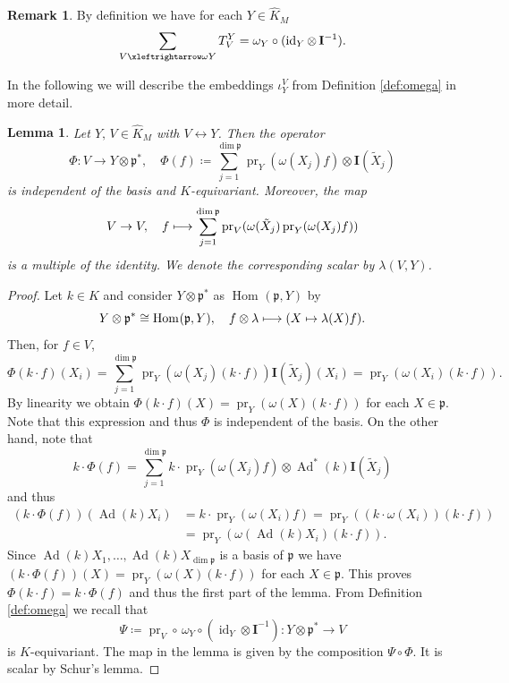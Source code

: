 \documentclass[JEP,XML,SOM,NoFloatCountersInSection,Unicode,published]{cedram}
\newcommand\mto{\mathchoice{\longmapsto}{\mapsto}{\mapsto}{\mapsto}}
\let\cdotm\cdot
\newtheorem{lemma}[theorem]{Lemma}
\theoremstyle{definition}
\newtheorem{remark}[theorem]{Remark}
\newcommand{\lra}{\ensuremath{\leftrightarrow}}
\newcommand{\lraomega}{\ensuremath{\xleftrightarrow\omega}}
\newcommand{\mf}[1]{\ensuremath{\mathfrak{#1}}}
\newcommand{\on}[1]{\ensuremath{\operatorname{#1}}}
\newcommand{\Hom}[3]{\ensuremath{\on{Hom}_{#1}(#2,#3)}}
\newcommand{\I}{\ensuremath{\mathbf{I}}}
\begin{document}
\begin{remark}\label{rem:sum_of_projections}
By definition we have for each $Y\in\hat K_M$
\[
\sum_{V\lraomega Y}T_V^Y=\omega_Y\circ(\on{id}_Y\otimes\,\I^{-1}).
\]
\end{remark}

In the following we will describe the embeddings $\iota_Y^V$ from Definition \ref{def:omega} in more detail.

\begin{lemma}\label{la:lambdaVY}
Let $Y,\, V\in\hat K_M$ with $V\lra Y$. Then the operator
\[
\Phi:V\to Y\otimes\mf p^*,\quad\Phi(f)\coloneqq\sum_{j=1}^{\dim\mf p}\on{pr}_Y(\omega(X_j)f)\otimes\I(\tilde X_j)
\]
is independent of the basis and $K$-equivariant. Moreover, the map
\[
V\to V,\quad f\mto\sum_{j=1}^{\dim\mf p}\on{pr}_V(\omega(\tilde X_j)\on{pr}_Y(\omega(X_j)f))
\]
is a multiple of the identity. We denote the corresponding scalar by $\lambda(V,Y)$.
\end{lemma}

\begin{proof}
Let $k\in K$ and consider $Y\otimes\mf p^*$ as $\Hom{}{\mf p}{Y}$ by
\[
Y\otimes\mf p^*\cong\Hom{}{\mf p}{Y},\quad f\otimes\lambda\mto(X\mapsto\lambda(X)f).
\]
Then, for $f\in V$,
\[
\Phi(k\cdotm f)(X_i)=\sum_{j=1}^{\dim\mf p}\on{pr}_Y(\omega(X_j)(k\cdotm f))\I(\tilde X_j)(X_i)=\on{pr}_Y(\omega(X_i)(k\cdotm f)).
\]
By linearity we obtain $\Phi(k\cdotm f)(X)=\on{pr}_Y(\omega(X)(k\cdotm f))$ for each $X\in\mf p$. Note that this expression and thus $\Phi$ is independent of the basis. On the other hand, note that
\[
k\cdotm \Phi(f)=\sum_{j=1}^{\dim\mf p}k\cdotm \on{pr}_Y(\omega(X_j)f)\otimes\on{Ad}^*(k)\I(\tilde X_j)
\]
and thus
\begin{align*}
(k\cdotm \Phi(f))(\on{Ad}(k)X_i)&=k\cdotm \on{pr}_Y(\omega(X_i)f)=\on{pr}_Y((k\cdotm \omega(X_i))(k\cdotm f))\\
&=\on{pr}_Y(\omega(\on{Ad}(k)X_i)(k\cdotm f)).
\end{align*}
Since $\on{Ad}(k)X_1,\ldots,\on{Ad}(k)X_{\dim\mf p}$ is a basis of $\mf p$ we have $(k\cdotm \Phi(f))(X)\!=\!\on{pr}_Y(\omega(X)(k\cdotm f))$ for each $X\in\mf p$. This proves $\Phi(k\cdotm f)=k\cdotm \Phi(f)$ and thus the first part of the lemma. From Definition \ref{def:omega} we recall that
\[
\Psi\coloneqq\on{pr}_V\circ\,\omega_Y\circ(\on{id}_Y\otimes\I^{-1})\colon Y\otimes\mf p^*\to V
\]
is $K$-equivariant. The map in the lemma is given by the composition $\Psi\circ\Phi$. It is scalar by Schur's lemma.
\end{proof}
\end{document}
